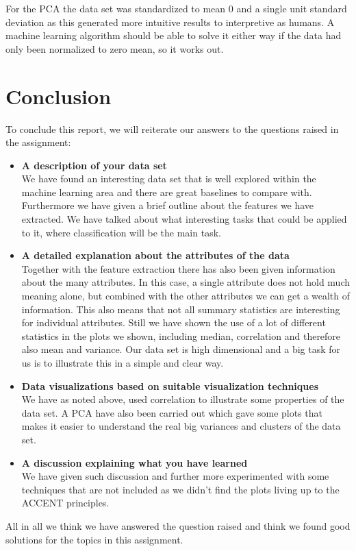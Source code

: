 For the PCA the data set was standardized to mean 0 and a single unit standard deviation as this generated more intuitive results to interpretive as humans. A machine learning algorithm should be able to solve it either way if the data had only been normalized to zero mean, so it works out. 

\section{Conclusion}

To conclude this report, we will reiterate our answers to the questions raised in the assignment:
\begin{itemize}
\item \textbf{A description of your data set}\\ 
We have found an interesting data set that is well explored within the machine learning area and there are great baselines to compare with. Furthermore we have given a brief outline about the features we have extracted. We have talked about what interesting tasks that could be applied to it, where classification will be the main task.

\item \textbf{A detailed explanation about the attributes of the data}\\
Together with the feature extraction there has also been given information about the many attributes. In this case, a single attribute does not hold much meaning alone, but combined with the other attributes we can get a wealth of information. This also means that not all summary statistics are interesting for individual attributes. Still we have shown the use of a lot of different statistics in the plots we shown, including median, correlation and therefore also mean and variance. Our data set is high dimensional and a big task for us is to illustrate this in a simple and clear way.

\item \textbf{Data visualizations based on suitable visualization techniques}\\
We have as noted above, used correlation to illustrate some properties of the data set. A PCA have also been carried out which gave some plots that makes it easier to understand the real big variances and clusters of the data set.

\item \textbf{A discussion explaining what you have learned}\\ 
We have given such discussion and further more experimented with some techniques that are not included as we didn’t find the plots living up to the ACCENT principles.
\end{itemize}

All in all we think we have answered the question raised and think we found good solutions for the topics in this assignment.

